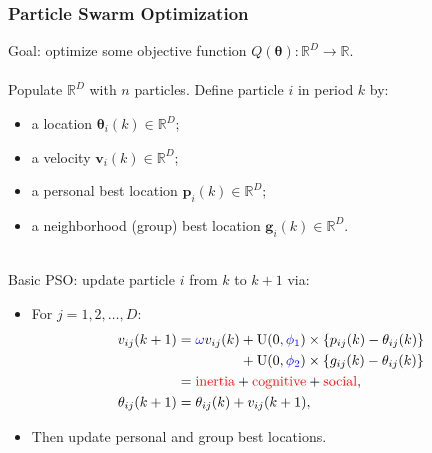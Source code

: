 \documentclass[xcolor=dvipsnames]{beamer}
\begin{document}
\begin{frame}
\frametitle{Particle Swarm Optimization}
Goal: optimize some objective function $Q(\bm{\theta}): \mathbb{R}^D \to \mathbb{R}$.\\~\\
Populate $\mathbb{R}^D$ with $n$ particles. Define particle $i$ in period $k$ by:
\begin{itemize}
\item a {\color{red}location} \hfill $\bm{\theta}_i(k)\in \mathbb{R}^D$;\hspace{2.5cm}\phantom{.}
\item a {\color{red}velocity} \hfill $\bm{v}_i(k) \in \mathbb{R}^D$;\hspace{2.5cm}\phantom{.}
\item a {\color{red}personal best} location \hfill $\bm{p}_i(k) \in \mathbb{R}^D$;\hspace{2.5cm}\phantom{.}
\item a {\color{red}neighborhood (group) best} location \hfill $\bm{g}_i(k) \in \mathbb{R}^D$.\hspace{2.5cm}\phantom{.} \\~\\
\end{itemize}

\pause

Basic PSO: update particle $i$ from $k$ to $k+1$ via: \\
\begin{itemize}
\item  For $j=1,2,\dots,D$:
\begin{align*}
v_{ij}(k+1) &= {\color{blue}\omega} v_{ij}(k) +  \mathrm{U}(0,{\color{blue}\phi_1})\times\{p_{ij}(k) - \theta_{ij}(k)\} \\
     &\;\phantom{= \omega v_{ij}(k)}+  \mathrm{U}(0,{\color{blue}\phi_2})\times\{g_{ij}(k) - \theta_{ij}(k)\}\\
& = \mbox{{\color{red}inertia}} + \mbox{{\color{red}cognitive}} + \mbox{{\color{red}social}},\\
\theta_{ij}(k+1) &= \theta_{ij}(k) + v_{ij}(k+1),
\end{align*}
\item Then update personal and group best locations.
\end{itemize}
\end{frame}
\end{document}
